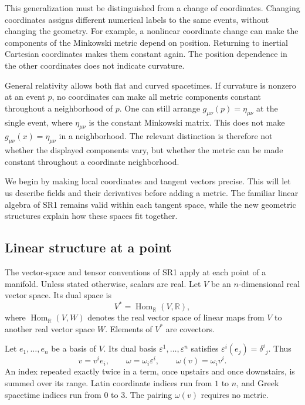 \documentclass[11pt,a4paper]{article}
\numberwithin{equation}{section}
\newcommand{\R}{\mathbb R}
\newcommand{\slidesref}[1]{\par\nobreak\smallskip\nobreak{\footnotesize\color{ink!60}\textsc{Source slides #1}}\par\nobreak\smallskip\nobreak}
\begin{document}
This generalization must be distinguished from a change of coordinates.
Changing coordinates assigns different numerical labels to the same events,
without changing the geometry. For example, a nonlinear coordinate change
can make the components of the Minkowski metric depend on position.
Returning to inertial Cartesian coordinates makes them constant again.
The position dependence in the other coordinates does not indicate
curvature.

General relativity allows both flat and curved spacetimes. If curvature
is nonzero at an event \(p\), no coordinates can make all metric components
constant throughout a neighborhood of \(p\). One can still arrange
\(g_{\mu\nu}(p)=\eta_{\mu\nu}\) at the single event, where
\(\eta_{\mu\nu}\) is the constant Minkowski matrix. This does not make
\(g_{\mu\nu}(x)=\eta_{\mu\nu}\) in a neighborhood. The relevant distinction
is therefore not whether the displayed components vary, but whether the
metric can be made constant throughout a coordinate neighborhood.

We begin by making local coordinates and tangent vectors precise. This
will let us describe fields and their derivatives before adding a metric.
The familiar linear algebra of SR1 remains valid within each tangent
space, while the new geometric structures explain how these spaces fit
together.

\subsection{Linear structure at a point}
\slidesref{2--4}

The vector-space and tensor conventions of SR1 apply at each point of a
manifold. Unless stated otherwise, scalars are real. Let \(V\) be an
\(n\)-dimensional real vector space. Its dual space is
\[
 V^*=\operatorname{Hom}_{\R}(V,\R),
\]
where \(\operatorname{Hom}_{\R}(V,W)\) denotes the real vector space of
linear maps from \(V\) to another real vector space \(W\). Elements of
\(V^*\) are covectors.

Let \(e_1,\ldots,e_n\) be a basis of \(V\). Its dual basis
\(\varepsilon^1,\ldots,\varepsilon^n\) satisfies
\(\varepsilon^i(e_j)=\delta^i{}_j\). Thus
\[
 v=v^i e_i,\qquad \omega=\omega_i\varepsilon^i,\qquad
 \omega(v)=\omega_i v^i.
\]
An index repeated exactly twice in a term, once upstairs and once
downstairs, is summed over its range. Latin coordinate indices run
from \(1\) to \(n\), and Greek spacetime indices run from \(0\) to
\(3\). The pairing \(\omega(v)\) requires no metric.
\end{document}
